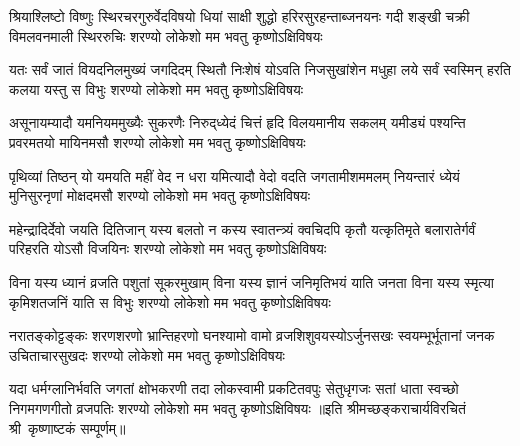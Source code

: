 
\fourlineindentedshloka
{श्रियाश्लिष्टो विष्णुः स्थिरचरगुरुर्वेदविषयो}
{धियां साक्षी शुद्धो हरिरसुरहन्ताब्जनयनः}
{गदी शङ्खी चक्री विमलवनमाली स्थिररुचिः}
{शरण्यो लोकेशो मम भवतु कृष्णोऽक्षिविषयः}

\fourlineindentedshloka
{यतः सर्वं जातं वियदनिलमुख्यं जगदिदम्}
{स्थितौ निःशेषं योऽवति निजसुखांशेन मधुहा}
{लये सर्वं स्वस्मिन् हरति कलया यस्तु स विभुः}
{शरण्यो लोकेशो मम भवतु कृष्णोऽक्षिविषयः}

\fourlineindentedshloka
{असूनायम्यादौ यमनियममुख्यैः सुकरणैः}
{निरुद्‌ध्येदं चित्तं हृदि विलयमानीय सकलम्}
{यमीड्यं पश्यन्ति प्रवरमतयो मायिनमसौ}
{शरण्यो लोकेशो मम भवतु कृष्णोऽक्षिविषयः}

\fourlineindentedshloka
{पृथिव्यां तिष्ठन् यो यमयति महीं वेद न धरा}
{यमित्यादौ वेदो वदति जगतामीशममलम्}
{नियन्तारं ध्येयं मुनिसुरनृणां मोक्षदमसौ}
{शरण्यो लोकेशो मम भवतु कृष्णोऽक्षिविषयः}

\fourlineindentedshloka
{महेन्द्रादिर्देवो जयति दितिजान् यस्य बलतो}
{न कस्य स्वातन्त्र्यं क्वचिदपि कृतौ यत्कृतिमृते}
{बलारातेर्गर्वं परिहरति योऽसौ विजयिनः}
{शरण्यो लोकेशो मम भवतु कृष्णोऽक्षिविषयः}

\fourlineindentedshloka
{विना यस्य ध्यानं व्रजति पशुतां सूकरमुखाम्}
{विना यस्य ज्ञानं जनिमृतिभयं याति जनता}
{विना यस्य स्मृत्या कृमिशतजनिं याति स विभुः}
{शरण्यो लोकेशो मम भवतु कृष्णोऽक्षिविषयः}

\fourlineindentedshloka
{नरातङ्कोट्टङ्कः शरणशरणो भ्रान्तिहरणो}
{घनश्यामो वामो व्रजशिशुवयस्योऽर्जुनसखः}
{स्वयम्भूर्भूतानां जनक उचिताचारसुखदः}
{शरण्यो लोकेशो मम भवतु कृष्णोऽक्षिविषयः}

\fourlineindentedshloka
{यदा धर्मग्लानिर्भवति जगतां क्षोभकरणी}
{तदा लोकस्वामी प्रकटितवपुः सेतुधृगजः}
{सतां धाता स्वच्छो निगमगणगीतो व्रजपतिः}
{शरण्यो लोकेशो मम भवतु कृष्णोऽक्षिविषयः}
॥इति श्रीमच्छङ्कराचार्यविरचितं श्री~कृष्णाष्टकं सम्पूर्णम्॥